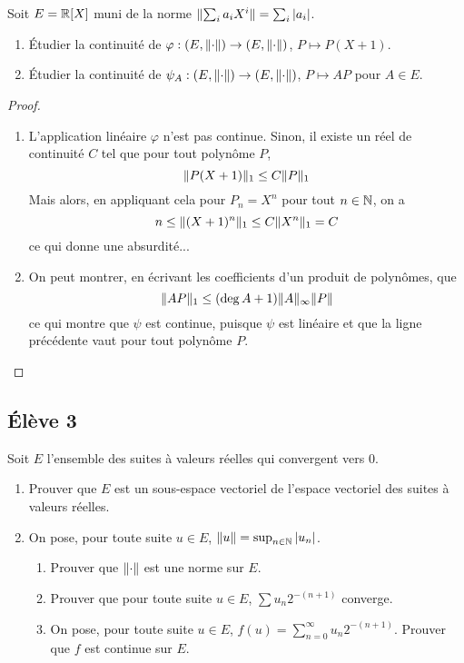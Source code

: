 \documentclass[10pt]{scrartcl}
\begin{document}
    \begin{exo}
        Soit $E=\operatorname{\mathbb R}[X]$ muni de la norme $\lVert \sum_ia_iX^i\rVert=\sum_i|a_i|$.
        \begin{enumerate}
            \item Étudier la continuité de $\varphi:(E,\lVert \cdot\rVert)\to(E,\lVert \cdot\rVert)$, $P\mapsto P(X+1)$. 
            \item Étudier la continuité de $\psi_A:(E,\lVert \cdot\rVert)\to(E,\lVert \cdot\rVert)$, $P\mapsto AP$ pour $A\in E$.
        \end{enumerate}
    \end{exo}

    \begin{proof}\hfill
        \begin{enumerate}
            \item L'application linéaire $\varphi$ n'est pas continue. Sinon, il existe un réel de continuité $C$ tel que pour tout polynôme $P$, 
            \[
                \lVert P(X+1)\rVert_1\leq C\lVert P\rVert_1
            \]
            Mais alors, en appliquant cela pour $P_n=X^n$ pour tout $n\in\operatorname{\mathbb N}$, on a 
            \[
                n\leq \lVert (X+1)^n\rVert_1\leq C\lVert X^n\rVert_1=C
            \]
            ce qui donne une absurdité... 
            \item On peut montrer, en écrivant les coefficients d'un produit de polynômes, que 
            \[
                \lVert AP\rVert_1\leq (\deg A+1)\lVert A\rVert_\infty \lVert P\rVert
            \]
            ce qui montre que $\psi$ est continue, puisque $\psi$ est linéaire et que la ligne précédente vaut pour tout polynôme $P$.
        \end{enumerate}
    \end{proof}

    \subsection*{Élève 3}

    \begin{ccp}
        Soit $E$ l'ensemble des suites à valeurs réelles qui convergent vers $0$. 
        \begin{enumerate}
            \item Prouver que $E$ est un sous-espace vectoriel de l'espace vectoriel des suites à valeurs réelles. 
            \item On pose, pour toute suite $u\in E$, $\lVert u\rVert=\sup_{n\in\operatorname{\mathbb N}}|u_n|$.
            \begin{enumerate}
                \item Prouver que $\lVert \cdot\rVert$ est une norme sur $E$.
                \item Prouver que pour toute suite $u\in E$, $\sum u_n2^{-(n+1)}$ converge.
                \item On pose, pour toute suite $u\in E$, $f(u)=\sum_{n=0}^\infty u_n2^{-(n+1)}$. Prouver que $f$ est continue sur $E$.
            \end{enumerate}
        \end{enumerate}
    \end{ccp}
\end{document}
